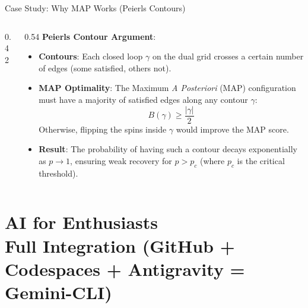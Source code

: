 \documentclass[A4,svgnames,9pt,aspectratio=169]{beamer}
\begin{document}
\begin{frame}{Case Study: Why MAP Works (Peierls Contours)}
\begin{columns}[c, onlytextwidth]
\begin{column}{0.42\textwidth}
\begin{center}
            \end{center}
        \end{column}
        \begin{column}{0.54\textwidth}
            \textbf{Peierls Contour Argument}:
            \begin{itemize}
                \setlength{\itemsep}{8pt}
                \item \textbf{Contours}: Each closed loop $\gamma$ on the dual grid crosses a certain number of edges (some satisfied, others not).
                \item \textbf{MAP Optimality}: The Maximum\emph{ A Posteriori} (MAP) configuration must have a majority of satisfied edges along any contour $\gamma$:
                \[ B(\gamma) \ge \frac{|\gamma|}{2} \]
                Otherwise, flipping the spins inside $\gamma$ would improve the MAP score.
                \item \textbf{Result}: The probability of having such a contour decays exponentially as $p \to 1$, ensuring weak recovery for $p > p_c$ (where $p_c$ is the critical threshold).
            \end{itemize}
        \end{column}
    \end{columns}
\end{frame}

\section[AI for Enthusiasts]{AI for Enthusiasts \\[2pt] \quad \normalsize\normalfont Full Integration (GitHub + Codespaces + Antigravity = Gemini-CLI)}
\frame{\sectionpage}
\end{document}
